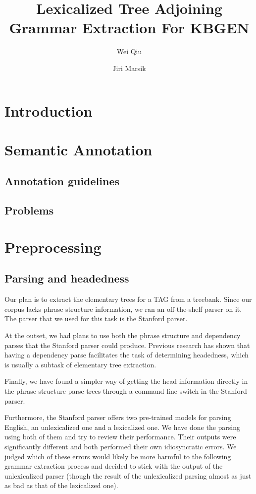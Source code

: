\documentclass[a4paper]{article}
\title{Lexicalized Tree Adjoining Grammar Extraction For KBGEN}
\author{Wei Qiu \and Jiri Marsik}
\begin{document}
\maketitle
\begin{abstract}
\end{abstract}
\section{Introduction}
\section{Semantic Annotation}
\label{sec:sem-annot}
\subsection{Annotation guidelines}
\subsection{Problems}


\section{Preprocessing}

\subsection{Parsing and headedness}

Our plan is to extract the elementary trees for a TAG from a treebank.
Since our corpus lacks phrase structure information, we ran an
off-the-shelf parser on it. The parser that we used for this task is
the Stanford parser.

At the outset, we had plans to use both the phrase structure and
dependency parses that the Stanford parser could produce. Previous
research has shown that having a dependency parse facilitates the task
of determining headedness, which is usually a subtask of elementary
tree extraction.

Finally, we have found a simpler way of getting the head information
directly in the phrase structure parse trees through a command line
switch in the Stanford parser.


Furthermore, the Stanford parser offers two pre-trained models for
parsing English, an unlexicalized one and a lexicalized one. We have
done the parsing using both of them and try to review their
performance. Their outputs were significantly different and both
performed their own idiosyncratic errors. We judged which of these
errors would likely be more harmful to the following grammar
extraction process and decided to stick with the output of the
unlexicalized parser (though the result of the unlexicalized parsing
almost as just as bad as that of the lexicalized one).
\end{document}
